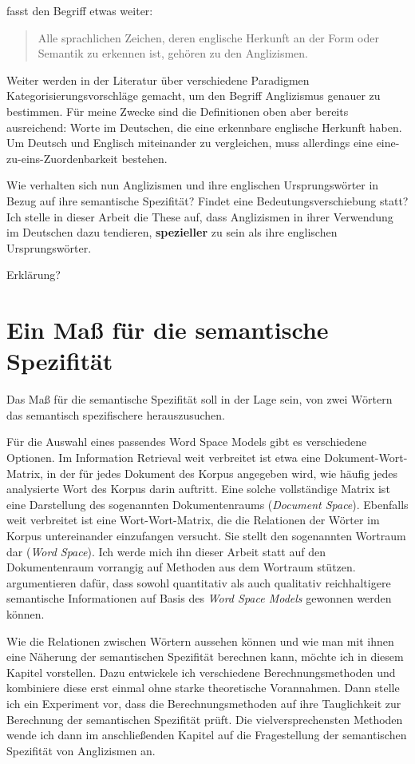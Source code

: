 \documentclass[11pt,numbers=noenddot]{scrartcl}
\begin{document}
\citet[S. 216]{burmasova2010empirische} fasst den Begriff etwas weiter:
\begin{quote}
    Alle sprachlichen Zeichen, deren englische Herkunft an der Form oder Semantik zu erkennen ist, gehören zu den Anglizismen.
\end{quote}

Weiter werden in der Literatur über verschiedene Paradigmen Kategorisierungsvorschläge gemacht, um den Begriff Anglizismus genauer zu bestimmen. Für meine Zwecke sind die Definitionen oben aber bereits ausreichend: Worte im Deutschen, die eine erkennbare englische Herkunft haben. Um Deutsch und Englisch miteinander zu vergleichen, muss allerdings eine eine-zu-eins-Zuordenbarkeit bestehen.

Wie verhalten sich nun Anglizismen und ihre englischen Ursprungswörter in Bezug auf ihre semantische Spezifität? Findet eine Bedeutungsverschiebung statt? Ich stelle in dieser Arbeit die These auf, dass Anglizismen in ihrer Verwendung im Deutschen dazu tendieren, \textbf{spezieller} zu sein als ihre englischen Ursprungswörter.

Erklärung?
\section{Ein Maß für die semantische Spezifität}

Das Maß für die semantische Spezifität soll in der Lage sein, von zwei Wörtern das semantisch spezifischere herauszusuchen.

Für die Auswahl eines passendes Word Space Models gibt es verschiedene Optionen. Im Information Retrieval weit verbreitet ist etwa eine Dokument-Wort-Matrix, in der für jedes Dokument des Korpus angegeben wird, wie häufig jedes analysierte Wort des Korpus darin auftritt. Eine solche vollständige Matrix ist eine Darstellung des sogenannten Dokumentenraums (\emph{Document Space})\citep[S.296]{manning1999}. Ebenfalls weit verbreitet ist eine Wort-Wort-Matrix, die die Relationen der Wörter im Korpus untereinander einzufangen versucht. Sie stellt den sogenannten Wortraum dar (\emph{Word Space}). Ich werde mich ihn dieser Arbeit statt auf den Dokumentenraum vorrangig auf Methoden aus dem Wortraum stützen. \citet{Schutze:1994:CTT:2856823.2856847} argumentieren dafür, dass sowohl quantitativ als auch qualitativ reichhaltigere semantische Informationen auf Basis des \emph{Word Space Models} gewonnen werden können.

Wie die Relationen zwischen Wörtern aussehen können und wie man mit ihnen eine Näherung der semantischen Spezifität berechnen kann, möchte ich in diesem Kapitel vorstellen. Dazu entwickele ich verschiedene Berechnungsmethoden und kombiniere diese erst einmal ohne starke theoretische Vorannahmen. Dann stelle ich ein Experiment vor, dass die Berechnungsmethoden auf ihre Tauglichkeit zur Berechnung der semantischen Spezifität prüft. Die vielversprechensten Methoden wende ich dann im anschließenden Kapitel auf die Fragestellung der semantischen Spezifität von Anglizismen an.
\end{document}
